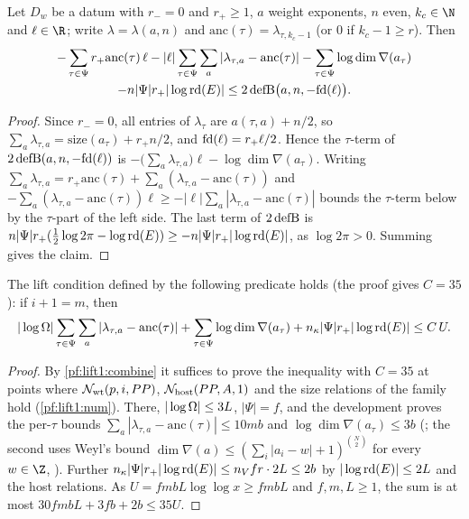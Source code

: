 \begin{lemma}\label{pf:lift1:twodef}
Let $D_w$ be a datum with $r_-=0$ and $r_+\ge1$, $a$ weight exponents, $n$ even, $k_c\in\N$ and
$\ell\in\R$; write $\lambda=\lambda(a,n)$ and $\mathrm{anc}(\tau)=\lambda_{\tau,k_c-1}$ (or $0$ if
$k_c-1\ge r$). Then
\begin{multline*}
-\sum_{\tau\in\Psi}r_+\mathrm{anc}(\tau)\,\ell-|\ell|\sum_{\tau\in\Psi}\sum_a|\lambda_{\tau,a}-\mathrm{anc}(\tau)|
-\sum_{\tau\in\Psi}\log\dim\nabla(a_\tau)\\
-n|\Psi|r_+|\log\mathrm{rd}(E)|\le2\,\mathrm{defB}\bigl(a,n,-\mathrm{fd}(\ell)\bigr).
\end{multline*}
\end{lemma}

\begin{proof}
Since $r_-=0$, all entries of $\lambda_\tau$ are $a(\tau,a)+n/2$, so
$\sum_a\lambda_{\tau,a}=\mathrm{size}(a_\tau)+r_+n/2$, and $\mathrm{fd}(\ell)=r_+\ell/2$. Hence the
$\tau$-term of $2\,\mathrm{defB}(a,n,-\mathrm{fd}(\ell))$ is
$-\bigl(\sum_a\lambda_{\tau,a}\bigr)\ell-\log\dim\nabla(a_\tau)$. Writing
$\sum_a\lambda_{\tau,a}=r_+\mathrm{anc}(\tau)+\sum_a(\lambda_{\tau,a}-\mathrm{anc}(\tau))$ and
$-\sum_a(\lambda_{\tau,a}-\mathrm{anc}(\tau))\ell\ge-|\ell|\sum_a|\lambda_{\tau,a}-\mathrm{anc}(\tau)|$
bounds the $\tau$-term below by the $\tau$-part of the left side. The last term of
$2\,\mathrm{defB}$ is $n|\Psi|r_+(\frac12\log2\pi-\log\mathrm{rd}(E))\ge-n|\Psi|r_+|\log\mathrm{rd}(E)|$,
as $\log2\pi>0$. Summing gives the claim.
\end{proof}

\begin{lemma}\label{pf:lift1:crude}
The lift condition defined by the following predicate holds (the proof gives $C=35$): if $i+1=m$, then
\[
|\log\Omega|\sum_{\tau\in\Psi}\sum_a|\lambda_{\tau,a}-\mathrm{anc}(\tau)|
+\sum_{\tau\in\Psi}\log\dim\nabla(a_\tau)+n_\kappa|\Psi|r_+|\log\mathrm{rd}(E)|\le C\,U .
\]
\end{lemma}

\begin{proof}
By \cref{pf:lift1:combine} it suffices to prove the inequality with $C=35$ at points where
$\mathcal N_{\mathrm{wt}}(p,i,PP)$, $\mathcal N_{\mathrm{host}}(PP,A,1)$ and the size relations of the family hold
(\cref{pf:lift1:num}). There, $|\log\Omega|\le3L$, $|\Psi|=f$, and the development proves the
per-$\tau$ bounds $\sum_a|\lambda_{\tau,a}-\mathrm{anc}(\tau)|\le10mb$ and
$\log\dim\nabla(a_\tau)\le3b$ (; the second uses Weyl's
bound $\dim\nabla(a)\le(\sum_i|a_i-w|+1)^{\binom N2}$ for every $w\in\Z$,
). Further
$n_\kappa|\Psi|r_+|\log\mathrm{rd}(E)|\le n_Vfr\cdot2L\le2b$ by $|\log\mathrm{rd}(E)|\le2L$ and the
host relations. As $U=fmbL\log\log x\ge fmbL$ and $f,m,L\ge1$, the sum is at most
$30fmbL+3fb+2b\le35U$.
\end{proof}

